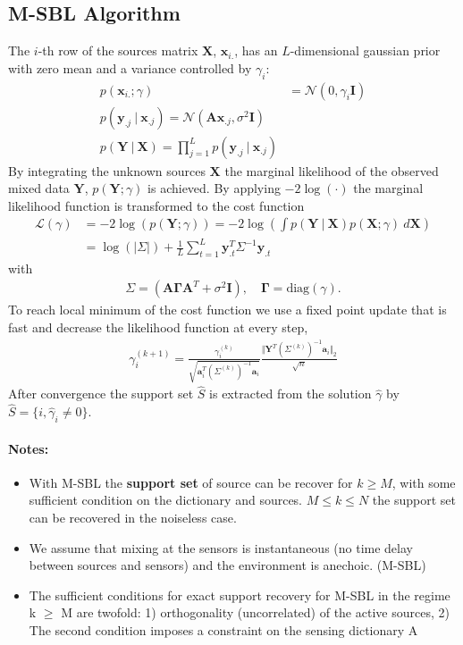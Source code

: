\subsection{M-SBL Algorithm}
The $i$-th row of the sources matrix $\mathbf{X}$, $\mathbf{x}_{i.}$, has an $L$-dimensional gaussian prior with zero mean and a variance controlled by $\gamma_i$:
\begin{align*}
p (\mathbf{x}_{i.} ; \gamma) &= \mathcal{N}(0, \gamma_i \mathbf{I}) \\
p (\mathbf{y}_{.j} \ \vert \ \mathbf{x}_{.j}) = \mathcal{N}(\mathbf{Ax}_{.j}, \sigma^2 \mathbf{I}) \\
p (\mathbf{Y} \ \vert \ \mathbf{X}) = \prod_{j=1}^L p (\mathbf{y}_{.j} \ \vert \ \mathbf{x}_{.j})
\end{align*}
By integrating the unknown sources $\mathbf{X}$ the marginal likelihood of the observed mixed data $\mathbf{Y}$, $p (\mathbf{Y} ; \gamma)$ is achieved. By applying $-2 \log (\cdot)$ the marginal likelihood function is transformed to the cost function
\begin{align*}
\mathcal{L}(\gamma) &= - 2 \log(p (\mathbf{Y} ; \gamma)) = -2 \log \left( \int p (\mathbf{Y} \ \vert \ \mathbf{X}) p (\mathbf{X} ; \gamma) \ d\mathbf{X} \right) \\
&= \log ( \vert \Sigma \vert) + \frac{1}{L} \sum_{t=1}^L \mathbf{y}_{.t}^T \Sigma^{-1} \mathbf{y}_{.t}
\end{align*}
with
\begin{align*}
\Sigma = (\mathbf{A} \boldsymbol{\Gamma} \mathbf{A}^T + \sigma^2 \mathbf{I}), \quad \boldsymbol{\Gamma} = \text{diag}(\gamma).
\end{align*}
To reach local minimum of the cost function we use a fixed point update that is fast and decrease the likelihood function at every step,
\begin{align*}
\gamma_i^{(k+1)} = \frac{\gamma_i^{(k)}}{\sqrt{\mathbf{a}_i^T (\Sigma^{(k)})^{-1} \mathbf{a}_i}} \frac{\Vert \mathbf{Y}^T (\Sigma^{(k)})^{-1} \mathbf{a}_i \Vert_2}{\sqrt{n}}
\end{align*}
After convergence the support set $\hat{S}$ is extracted from the solution $\hat{\gamma}$ by $\hat{S} = \{ i, \hat{\gamma}_i \neq 0 \}$.


\paragraph{Notes:}
\begin{itemize}
\item With M-SBL the \textbf{support set} of source can be recover for $k \geq M$, with some sufficient condition on the dictionary and sources. $M \leq k \leq N$ the support set can be recovered in the noiseless case.
\item We assume that mixing at the sensors is instantaneous (no time delay between sources and sensors) and the environment is anechoic. (M-SBL)
\item The sufficient conditions for exact support recovery for M-SBL in the regime k $\geq$ M are twofold: 1) orthogonality (uncorrelated) of the active sources, 2) The second condition imposes a constraint on the sensing dictionary A
\end{itemize}
